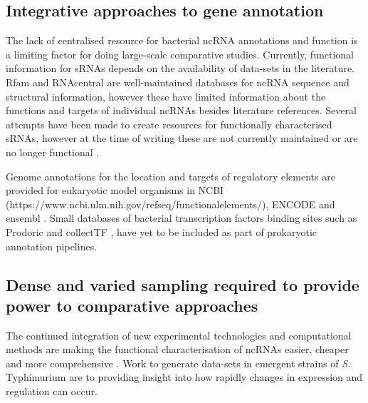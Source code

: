 

\subsection{Integrative approaches to gene annotation}

The lack of centralised resource for bacterial ncRNA annotations and function is a limiting factor for doing large-scale comparative studies. Currently, functional information for sRNAs depends on the availability of data-sets in the literature. Rfam \citep{Nawrocki2015-aatt} and RNAcentral \citep{The_RNAcentral_Consortium2019-lf} are well-maintained databases for ncRNA sequence and structural information, however these have limited information about the functions and targets of individual ncRNAs besides literature references. Several attempts have been made to create resources for functionally characterised sRNAs, however at the time of writing these are not currently maintained \citep{Li2013-wl,Huang2009-kk} or are no longer functional \citep{Wang2016-ul,Pischimarov2012-za}. 

Genome annotations for the location and targets of regulatory elements are provided for eukaryotic model organisms in NCBI (https://www.ncbi.nlm.nih.gov/refseq/functionalelements/), ENCODE \citep{ENCODE_Project_Consortium2012-qj} and ensembl \citep{Zerbino2015-fr,Zerbino2016-ak}. Small databases of bacterial transcription factors binding sites such as Prodoric \citep{Eckweiler2018-ay} and collectTF \citep{Kilic2014-md}, have yet to be included as part of prokaryotic annotation pipelines.

\subsection{Dense and varied sampling required to provide power to comparative approaches}

The continued integration of new experimental technologies and computational methods are making the functional characterisation of ncRNAs easier, cheaper and more comprehensive \citep{Georg2019-vl,Stav2019-mr}. Work to generate data-sets in emergent strains of \textit{S.} Typhimurium \citep{Canals2019-xxyv} are to providing insight into how rapidly changes in expression and regulation can occur. 


